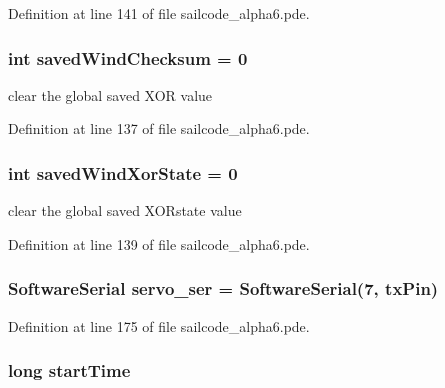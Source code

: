 \-Definition at line 141 of file sailcode\-\_\-alpha6.\-pde.

\hypertarget{group__group1_gaf7ce3159cdebccf941f8db4e70f5764e}{
\subsubsection[{saved\-Wind\-Checksum}]{\setlength{\rightskip}{0pt plus 5cm}int {\bf saved\-Wind\-Checksum} = 0}}
\label{group__group1_gaf7ce3159cdebccf941f8db4e70f5764e}


clear the global saved \-X\-O\-R value 



\-Definition at line 137 of file sailcode\-\_\-alpha6.\-pde.

\hypertarget{group__group1_gabc070e9e6f6449471852bd233593d1d2}{
\subsubsection[{saved\-Wind\-Xor\-State}]{\setlength{\rightskip}{0pt plus 5cm}int {\bf saved\-Wind\-Xor\-State} = 0}}
\label{group__group1_gabc070e9e6f6449471852bd233593d1d2}


clear the global saved \-X\-O\-Rstate value 



\-Definition at line 139 of file sailcode\-\_\-alpha6.\-pde.

\hypertarget{group__group1_gad08dcd7d87414b8d7f7e9cf2689ea5d8}{
\subsubsection[{servo\-\_\-ser}]{\setlength{\rightskip}{0pt plus 5cm}\-Software\-Serial {\bf servo\-\_\-ser} = \-Software\-Serial(7, tx\-Pin)}}
\label{group__group1_gad08dcd7d87414b8d7f7e9cf2689ea5d8}


\-Definition at line 175 of file sailcode\-\_\-alpha6.\-pde.

\hypertarget{group__group1_ga8ad49a66e91d8658c5f1f7dbcbcbbd2f}{
\subsubsection[{start\-Time}]{\setlength{\rightskip}{0pt plus 5cm}long {\bf start\-Time}}}
\label{group__group1_ga8ad49a66e91d8658c5f1f7dbcbcbbd2f}



